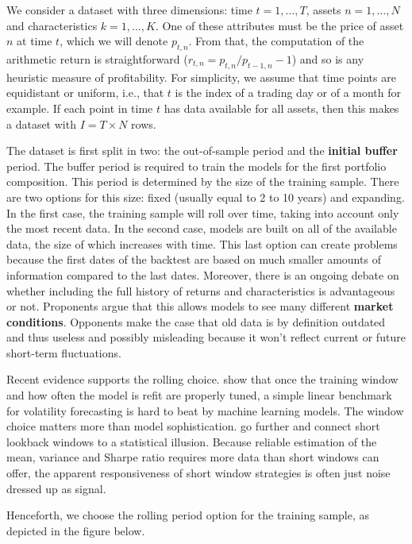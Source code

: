 We consider a dataset with three dimensions: time $t=1,\dots,T$, assets $n=1,\dots,N$ and characteristics $k=1,\dots,K$. One of these attributes must be the price of asset $n$ at time $t$, which we will denote $p_{t,n}$. From that, the computation of the arithmetic return is straightforward ($r_{t,n}=p_{t,n}/p_{t -1,n} -1$) and so is any heuristic measure of profitability. For simplicity, we assume that time points are equidistant or uniform, i.e., that $t$ is the index of a trading day or of a month for example. If each point in time $t$ has data available for all assets, then this makes a dataset with $I=T\times N$ rows.

The dataset is first split in two: the out-of-sample period and the \textbf{initial buffer} period. The buffer period is required to train the models for the first portfolio composition. This period is determined by the size of the training sample. There are two options for this size: fixed (usually equal to 2 to 10 years) and expanding. In the first case, the training sample will roll over time, taking into account only the most recent data. In the second case, models are built on all of the available data, the size of which increases with time. This last option can create problems because the first dates of the backtest are based on much smaller amounts of information compared to the last dates. Moreover, there is an ongoing debate on whether including the full history of returns and characteristics is advantageous or not. Proponents argue that this allows models to see many different \textbf{market conditions}. Opponents make the case that old data is by definition outdated and thus useless and possibly misleading because it won't reflect current or future short-term fluctuations.

Recent evidence supports the rolling choice. \cite{audrino2024hard} show that once the training window and how often the model is refit are properly tuned, a simple linear benchmark for volatility forecasting is hard to beat by machine learning models. The window choice matters more than model sophistication. \cite{bloch2025false} go further and connect short lookback windows to a statistical illusion. Because reliable estimation of the mean, variance and Sharpe ratio requires more data than short windows can offer, the apparent responsiveness of short window strategies is often just noise dressed up as signal.

Henceforth, we choose the rolling period option for the training sample, as depicted in the figure below.

